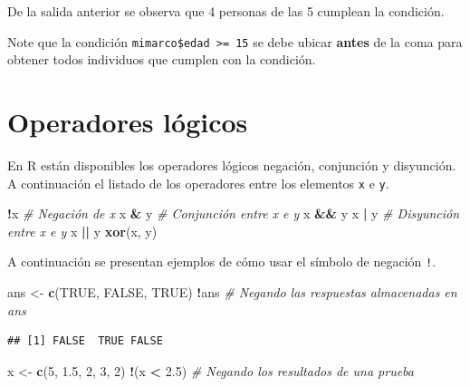 \documentclass[10pt,]{krantz}
\makeatletter
\newenvironment{Shaded}{\begin{snugshade}}{\end{snugshade}}
\newcommand{\KeywordTok}[1]{\textcolor[rgb]{0.13,0.29,0.53}{\textbf{#1}}}
\newcommand{\DecValTok}[1]{\textcolor[rgb]{0.00,0.00,0.81}{#1}}
\newcommand{\FloatTok}[1]{\textcolor[rgb]{0.00,0.00,0.81}{#1}}
\newcommand{\StringTok}[1]{\textcolor[rgb]{0.31,0.60,0.02}{#1}}
\newcommand{\CommentTok}[1]{\textcolor[rgb]{0.56,0.35,0.01}{\textit{#1}}}
\newcommand{\OtherTok}[1]{\textcolor[rgb]{0.56,0.35,0.01}{#1}}
\newcommand{\OperatorTok}[1]{\textcolor[rgb]{0.81,0.36,0.00}{\textbf{#1}}}
\newcommand{\NormalTok}[1]{#1}
\let\proglang=\textsf
\newenvironment{kframe}{%
\medskip{}
\setlength{\fboxsep}{.8em}
 \def\at@end@of@kframe{}%
 \ifinner\ifhmode%
  \def\at@end@of@kframe{\end{minipage}}%
  \begin{minipage}{\columnwidth}%
 \fi\fi%
 \def\FrameCommand##1{\hskip\@totalleftmargin \hskip-\fboxsep
 \colorbox{shadecolor}{##1}\hskip-\fboxsep
     \hskip-\linewidth \hskip-\@totalleftmargin \hskip\columnwidth}%
 \MakeFramed {\advance\hsize-\width
   \@totalleftmargin\z@ \linewidth\hsize
   \@setminipage}}%
 {\par\unskip\endMakeFramed%
 \at@end@of@kframe}
\renewenvironment{Shaded}{\begin{kframe}}{\end{kframe}}
\let\BeginKnitrBlock\begin \let\EndKnitrBlock\end
\makeatother
\begin{document}
De la salida anterior se observa que 4 personas de las 5 cumplean la
condición.

\BeginKnitrBlock{rmdwarning}
Note que la condición \texttt{mimarco\$edad\ \textgreater{}=\ 15} se
debe ubicar \textbf{antes} de la coma para obtener todos individuos que
cumplen con la condición.
\EndKnitrBlock{rmdwarning}

\section{\texorpdfstring{Operadores lógicos
}{Operadores lógicos }}\label{operadores-logicos}

En \proglang{R} están disponibles los operadores lógicos negación,
conjunción y disyunción. A continuación el listado de los operadores
entre los elementos \texttt{x} e \texttt{y}.

\begin{Shaded}
\begin{Highlighting}[]
\OperatorTok{!}\NormalTok{x  }\CommentTok{# Negación de x}
\NormalTok{x }\OperatorTok{&}\StringTok{ }\NormalTok{y  }\CommentTok{# Conjunción entre x e y}
\NormalTok{x }\OperatorTok{&&}\StringTok{ }\NormalTok{y}
\NormalTok{x }\OperatorTok{|}\StringTok{ }\NormalTok{y  }\CommentTok{# Disyunción entre x e y}
\NormalTok{x }\OperatorTok{||}\StringTok{ }\NormalTok{y}
\KeywordTok{xor}\NormalTok{(x, y)}
\end{Highlighting}
\end{Shaded}

A continuación se presentan ejemplos de cómo usar el símbolo de negación
\texttt{!}.

\begin{Shaded}
\begin{Highlighting}[]
\NormalTok{ans <-}\StringTok{ }\KeywordTok{c}\NormalTok{(}\OtherTok{TRUE}\NormalTok{, }\OtherTok{FALSE}\NormalTok{, }\OtherTok{TRUE}\NormalTok{)}
\OperatorTok{!}\NormalTok{ans  }\CommentTok{# Negando las respuestas almacenadas en ans}
\end{Highlighting}
\end{Shaded}

\begin{verbatim}
## [1] FALSE  TRUE FALSE
\end{verbatim}

\begin{Shaded}
\begin{Highlighting}[]
\NormalTok{x <-}\StringTok{ }\KeywordTok{c}\NormalTok{(}\DecValTok{5}\NormalTok{, }\FloatTok{1.5}\NormalTok{, }\DecValTok{2}\NormalTok{, }\DecValTok{3}\NormalTok{, }\DecValTok{2}\NormalTok{)}
\OperatorTok{!}\NormalTok{(x }\OperatorTok{<}\StringTok{ }\FloatTok{2.5}\NormalTok{)  }\CommentTok{# Negando los resultados de una prueba}
\end{Highlighting}
\end{Shaded}
\end{document}
